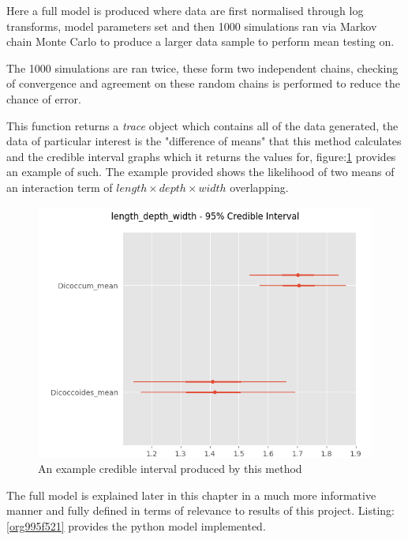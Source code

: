 \documentclass[11pt]{report}
\begin{document}
Here a full model is produced where data are first normalised through log transforms, model parameters set and then 1000 simulations ran via Markov chain Monte Carlo to produce a larger data sample to perform mean testing on.

The 1000 simulations are ran twice, these form two independent chains, checking of convergence and agreement on these random chains is performed to reduce the chance of error.

This function returns a \emph{trace} object which contains all of the data generated, the data of particular interest is the "difference of means" that this method calculates and the credible interval graphs which it returns the values for, figure:\ref{fig:org5fb2891} provides an example of such. The example provided shows the likelihood of two means of an interaction term of
\(length \times  depth \times width\) overlapping.

\begin{figure}[htbp]
\centering
\includegraphics[width=15cm]{./images/ci.png}
\caption{\label{fig:org5fb2891}
An example credible interval produced by this method}
\end{figure}


The full model is explained later in this chapter in a much more informative manner and fully defined in terms of relevance to results of this project. Listing:\ref{org995f521} provides the python model implemented.
\end{document}
